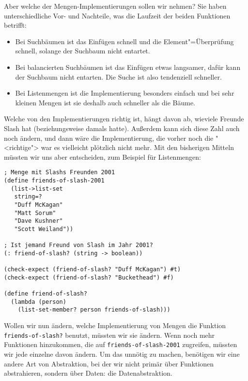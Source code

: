 Aber welche der Mengen-Implementierungen sollen wir nehmen?  Sie haben
unterschiedliche Vor- und Nachteile, was die Laufzeit der beiden
Funktionen betrifft:
%
\begin{itemize}
\item Bei Suchbäumen ist das Einfügen schnell und die
  Element"=Überprüfung schnell, solange der Suchbaum nicht entartet.
\item Bei balancierten Suchbäumen ist das Einfügen etwas langsamer,
  dafür kann der Suchbaum nicht entarten.  Die Suche ist also
  tendenziell schneller.
\item Bei Listenmengen ist die Implementierung besonders einfach und
  bei sehr kleinen Mengen ist sie deshalb auch schneller als die
  Bäume.
\end{itemize}
%
Welche von den Implementierungen richtig ist, hängt davon ab, wieviele
Freunde Slash hat (beziehungsweise damals hatte).  Außerdem kann sich
diese Zahl auch noch ändern, und dann wäre die Implementierung, die
vorher noch die "<richtige"> war es vielleicht plötzlich nicht mehr.
Mit den bisherigen Mitteln müssten wir uns aber entscheiden, zum
Beispiel für Listenmengen:
%
\begin{lstlisting}
; Menge mit Slashs Freunden 2001
(define friends-of-slash-2001
  (list->list-set
   string=?
   "Duff McKagan"
   "Matt Sorum"
   "Dave Kushner"
   "Scott Weiland"))

; Ist jemand Freund von Slash im Jahr 2001?
(: friend-of-slash? (string -> boolean))

(check-expect (friend-of-slash? "Duff McKagan") #t)
(check-expect (friend-of-slash? "Buckethead") #f)

(define friend-of-slash?
  (lambda (person)
    (list-set-member? person friends-of-slash)))
\end{lstlisting}
%
Wollen wir nun ändern, welche Implementierung von Mengen die Funktion
\lstinline{friends-of-slash?}  benutzt, müssten wir sie ändern.  Wenn
noch mehr Funktionen hinzukommen, die auf
\lstinline{friends-of-slash-2001} zugreifen, müssten wir jede einzelne
davon ändern.  Um das unnötig zu machen, benötigen wir eine andere Art
von Abstraktion, bei der wir nicht primär über Funktionen
abstrahieren, sondern über Daten: die
Datenabstraktion.



